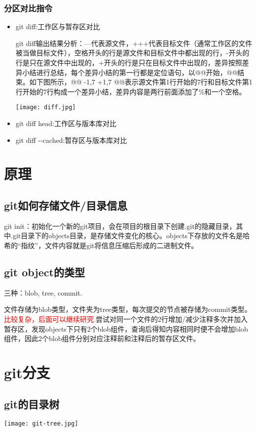 \documentclass[cn,hazy,blue,14pt,通用]{elegantnote}
\begin{document}
        \subsubsection{分区对比指令}
        \begin{itemize}
            \item git diff:工作区与暂存区对比
            
            git diff输出结果分析：---代表源文件，+++代表目标文件（通常工作区的文件被当做目标文件），空格开头的行是源文件和目标文件中都出现的行，-开头的行是只在源文件中出现的，+开头的行是只在目标文件中出现的，差异按照差异小结进行总结，每个差异小结的第一行都是定位语句，以@@开始，@@结束。如下图所示，@@ -1,7 +1,7 @@表示源文件第1行开始的7行和目标文件第1行开始的7行构成一个差异小结，差异内容是两行前面添加了\%和一个空格。


            \texttt{[image: diff.jpg]}


            \item git diff head:工作区与版本库对比
            \item git diff -\space-cached:暂存区与版本库对比
        \end{itemize}
\section{原理}
    \subsection{git如何存储文件/目录信息}
        git init：初始化一个新的git项目，会在项目的根目录下创建.git的隐藏目录，其中.git目录下的objects目录，是存储文件变化的核心。objects下存放的文件名是哈希的“指纹”，文件内容就是git将信息压缩后形成的二进制文件。
    \subsection{git object的类型}
        三种：blob, tree, commit.

        文件存储为blob类型，文件夹为tree类型，每次提交的节点被存储为commit类型。\textcolor{red}{比较复杂，后面可以继续研究.}尝试对同一个文件的2行增加/减少注释多次并加入暂存区，发现objects下只有2个blob组件，查询后得知内容相同时便不会增加blob组件，因此2个blob组件分别对应注释前和注释后的暂存区文件。
\section{git分支}
    \subsection{git的目录树}
        \texttt{[image: git-tree.jpg]}
\end{document}
